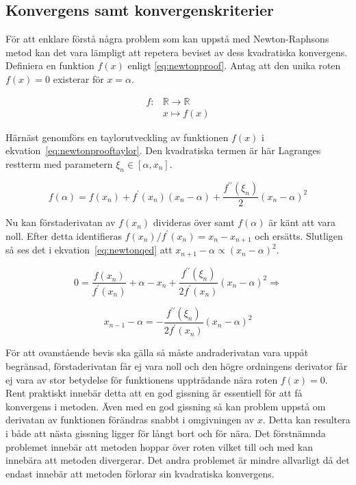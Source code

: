 \subsection{Konvergens samt konvergenskriterier}

För att enklare förstå några problem som kan uppstå med Newton-Raphsons metod kan det vara lämpligt
att repetera beviset av dess kvadratiska konvergens. Definiera en funktion $f(x)$ enligt \eqref{eq:newtonproof}.
Antag att den unika roten $f(x) = 0$ existerar för $x = \alpha$.

\begin{align}
f: & \mathbb{R} \to \mathbb{R} \nonumber \\
   & x \mapsto f(x) \label{eq:newtonproof}
\end{align}

\noindent
Härnäst genomförs en taylorutveckling av funktionen $f(x)$ i ekvation~\eqref{eq:newtonprooftaylor}.
Den kvadratiska termen är här Lagranges restterm med parametern $\xi_n \in [\alpha, x_n]$.

\begin{equation}
\label{eq:newtonprooftaylor}
f(\alpha) = f(x_n) + f^\prime(x_n)(x_n-\alpha) + \frac{f^{\prime\prime}(\xi_n)}{2}(x_n-\alpha)^2
\end{equation}

\noindent
Nu kan förstaderivatan av $f(x_n)$ divideras över samt $f(\alpha)$ är känt att vara noll.
Efter detta identifieras $f(x_n)/f^\prime(x_n) = x_n-x_{n+1}$ och ersätts. Slutligen så ses
det i ekvation~\eqref{eq:newtonqed} att $x_{n+1}-\alpha \propto (x_{n}-\alpha)^2$.

\begin{equation}
0 = \frac{f(x_n)}{f^\prime(x_n)} + \alpha - x_n + \frac{f^{\prime\prime}(\xi_n)}{2f^\prime(x_n)}(x_n-\alpha)^2
\Rightarrow
\end{equation}

\begin{equation}
\label{eq:newtonqed}
x_{n-1} - \alpha = - \frac{f^{\prime\prime}(\xi_n)}{2f^\prime(x_n)}(x_n-\alpha)^2 
\end{equation}

\noindent
För att ovanstående bevis ska gälla så måste andraderivatan vara uppåt begränsad, förstaderivatan får ej
vara noll och den högre ordningens derivator får ej vara av stor betydelse för funktionens uppträdande
nära roten $f(x) = 0$. Rent praktiskt innebär detta att en god gissning är essentiell för att få
konvergens i metoden. Även med en god gissning så kan problem uppstå om derivatan av funktionen
förändras snabbt i omgivningen av $x$. Detta kan resultera i både att nästa gissning ligger för långt
bort och för nära. Det förstnämnda problemet innebär att metoden hoppar över roten vilket till och med
kan innebära att metoden divergerar. Det andra problemet är mindre allvarligt då det endast innebär 
att metoden förlorar sin kvadratiska konvergens.

